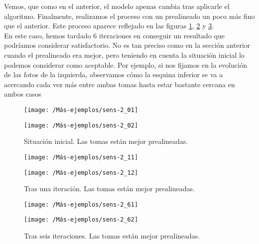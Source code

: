 Vemos, que como en el anterior, el modelo apenas cambia tras aplicarle el algoritmo. Finalmente, realizamos el proceso con un prealineado un poco más fino que el anterior. Este proceso aparece reflejado en las figuras \ref{fig:sensi3-1}, \ref{fig:sensi3-2} y \ref{fig:sensi3-3}.\\

En este caso, hemos tardado 6 iteraciones en conseguir un resultado que podríamos considerar satisfactorio. No es tan preciso como en la sección anterior cuando el prealineado era mejor, pero teniendo en cuenta la situación inicial lo podemos considerar como aceptable. Por ejemplo, si nos fijamos en la evolución de las fotos de la izquierda, observamos cómo la esquina inferior se va a acercando cada vez más entre ambas tomas hasta estar bastante cercana en ambos casos

\begin{figure}[h!]	
	\begin{minipage}{0.5\textwidth}
		\centering		
		\texttt{[image: /Más-ejemplos/sens-2\_01]} 
	\end{minipage}
	\begin{minipage}{0.5\textwidth}
		\centering
		\texttt{[image: /Más-ejemplos/sens-2\_02]}
	\end{minipage}	
	\caption{Situación inicial. Las tomas están mejor prealineadas.}
	\label{fig:sensi3-1}
\end{figure}
\begin{figure}[h!]	
	\begin{minipage}{0.5\textwidth}
		\centering		
		\texttt{[image: /Más-ejemplos/sens-2\_11]} 
	\end{minipage}
	\begin{minipage}{0.5\textwidth}
		\centering
		\texttt{[image: /Más-ejemplos/sens-2\_12]}
	\end{minipage}	
	\caption{Tras una iteración. Las tomas están mejor prealineadas.}
	\label{fig:sensi3-2}
\end{figure}
\begin{figure}[h!]	
	\begin{minipage}{0.5\textwidth}
		\centering		
		\texttt{[image: /Más-ejemplos/sens-2\_61]} 
	\end{minipage}
	\begin{minipage}{0.5\textwidth}
		\centering
		\texttt{[image: /Más-ejemplos/sens-2\_62]}
	\end{minipage}	
	\caption{Tras seis iteraciones. Las tomas están mejor prealineadas.}
	\label{fig:sensi3-3}
\end{figure}


